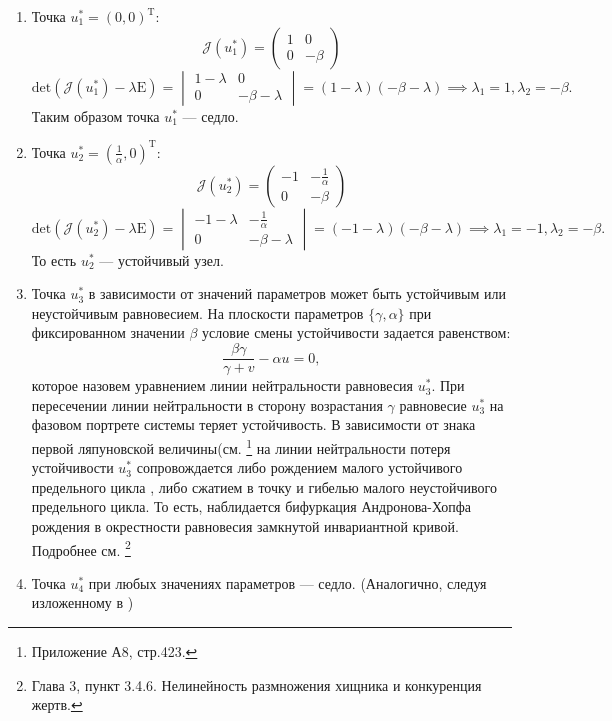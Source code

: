 \documentclass[10pt]{article}
\numberwithin{equation}{section}
\begin{document}
\begin{enumerate}
	\item Точка \( u_1^* = (0, 0)^{\mathrm{T}} \):
	\[ \mathcal{J}(u_1^*) = \begin{pmatrix} 1 & 0 \\ 0 & -\beta \end{pmatrix} \]
	\[ \mathrm{det}(\mathcal{J}(u_1^*) - \lambda \mathrm{E}) = \begin{vmatrix} 1 - \lambda & 0 \\ 0 & -\beta - \lambda \end{vmatrix} = (1 - \lambda)(-\beta - \lambda) \implies \lambda_1 = 1, \lambda_2 = -\beta.\]
	Таким образом точка \( u_1^* \) --- седло.
	\item Точка \( u_2^* = (\frac{1}{\alpha}, 0)^{\mathrm{T}} \):
	\[ \mathcal{J}(u_2^*) = \begin{pmatrix} -1 & -\frac{1}{\alpha} \\ 0 & -\beta \end{pmatrix} \]
	\[ \mathrm{det}(\mathcal{J}(u_2^*) - \lambda \mathrm{E}) = \begin{vmatrix} -1 - \lambda & -\frac{1}{\alpha} \\ 0 & -\beta - \lambda \end{vmatrix} = (-1 - \lambda)(-\beta - \lambda) \implies \lambda_1 = -1, \lambda_2 = -\beta.\]	
	То есть \( u_2^* \) --- устойчивый узел.
	\item Точка \( u_3^* \) в зависимости от значений параметров может быть устойчивым или неустойчивым равновесием. На плоскости параметров \( \{ \gamma, \alpha \} \) при фиксированном значении \( \beta \) условие смены устойчивости задается равенством:
	\[ \frac{\beta \gamma}{\gamma + v} - \alpha u = 0, \]
	которое назовем уравнением линии нейтральности равновесия \( u_3^* \). При пересечении линии нейтральности в сторону возрастания \( \gamma \) равновесие \( u_3^* \) на фазовом портрете системы теряет устойчивость. В зависимости от знака первой ляпуновской величины(см. \cite{1} \footnote{Приложение А8, стр.423.} на линии нейтральности потеря устойчивости \( u_3^* \) сопровождается либо рождением малого устойчивого предельного цикла , либо сжатием в точку и гибелью малого неустойчивого предельного цикла. То есть, наблидается бифуркация Андронова-Хопфа рождения в окрестности равновесия замкнутой инвариантной кривой. Подробнее см.  \cite{2} \footnote{Глава 3, пункт 3.4.6. Нелинейность размножения хищника и конкуренция жертв.}
	\item Точка \( u_4^* \) при любых значениях параметров --- седло. (Аналогично, следуя изложенному в  \cite{2})
\end{enumerate}
\end{document}
